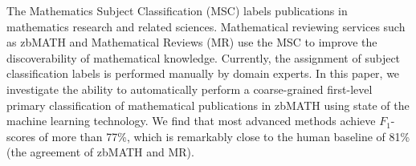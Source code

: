 The Mathematics Subject Classification (MSC) labels publications in mathematics research and related sciences.
Mathematical reviewing services such as zbMATH and Mathematical Reviews (MR) use the MSC to improve the discoverability of mathematical knowledge.
Currently, the assignment of subject classification labels is performed manually by domain experts.
In this paper, we investigate the ability to automatically perform a coarse-grained first-level primary classification of mathematical publications in zbMATH using state of the machine learning technology.
We find that most advanced methods achieve $F_1$-scores of more than 77\%, which is remarkably close to the human baseline of 81\% (the agreement of zbMATH and MR).